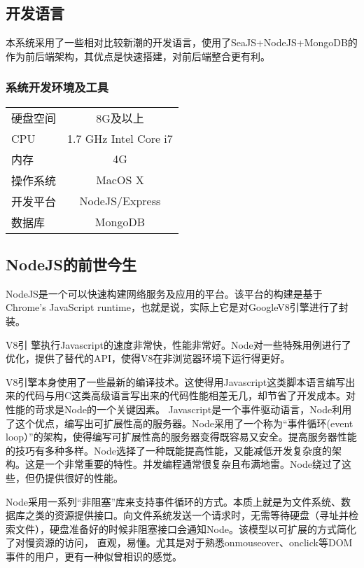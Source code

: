 
\subsection{开发语言}
\indent
本系统采用了一些相对比较新潮的开发语言，使用了SeaJS+NodeJS+MongoDB的作为前后端架构，其优点是快速搭建，对前后端整合更有利。

\subsubsection{系统开发环境及工具}
\begin{tabular}{ l c }
  硬盘空间 & 8G及以上 \\
  CPU & 1.7 GHz Intel Core i7 \\
  内存 & 4G \\
  操作系统 & MacOS X \\
  开发平台 & NodeJS/Express \\
  数据库 & MongoDB \\
\end{tabular}

\subsection{NodeJS的前世今生}
\indent
NodeJS是一个可以快速构建网络服务及应用的平台。该平台的构建是基于Chrome's JavaScript runtime，也就是说，实际上它是对GoogleV8引擎进行了封装。

V8引 擎执行Javascript的速度非常快，性能非常好。Node对一些特殊用例进行了优化，提供了替代的API，使得V8在非浏览器环境下运行得更好。

V8引擎本身使用了一些最新的编译技术。这使得用Javascript这类脚本语言编写出来的代码与用C这类高级语言写出来的代码性能相差无几，却节省了开发成本。对性能的苛求是Node的一个关键因素。 Javascript是一个事件驱动语言，Node利用了这个优点，编写出可扩展性高的服务器。Node采用了一个称为“事件循环(event loop）”的架构，使得编写可扩展性高的服务器变得既容易又安全。提高服务器性能的技巧有多种多样。Node选择了一种既能提高性能，又能减低开发复杂度的架构。这是一个非常重要的特性。并发编程通常很复杂且布满地雷。Node绕过了这些，但仍提供很好的性能。

Node采用一系列“非阻塞”库来支持事件循环的方式。本质上就是为文件系统、数据库之类的资源提供接口。向文件系统发送一个请求时，无需等待硬盘（寻址并检索文件），硬盘准备好的时候非阻塞接口会通知Node。该模型以可扩展的方式简化了对慢资源的访问， 直观，易懂。尤其是对于熟悉onmouseover、onclick等DOM事件的用户，更有一种似曾相识的感觉。

